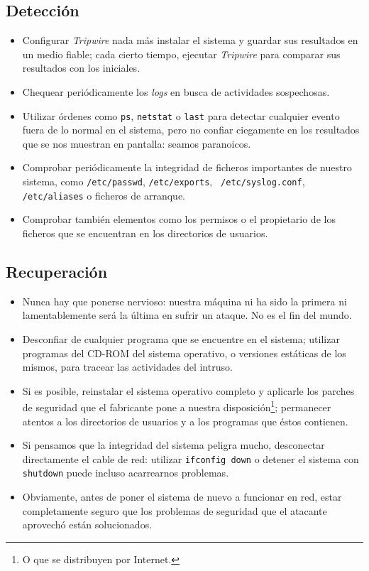 \subsection{Detecci\'on}
\begin{itemize}
\item Configurar {\it Tripwire} nada m\'as instalar el sistema y guardar sus
resultados en un medio fiable; cada cierto tiempo, ejecutar {\it Tripwire} para
comparar sus resultados con los iniciales.
\item Chequear peri\'odicamente los {\it logs} en busca de actividades 
sospechosas.
\item Utilizar \'ordenes como {\tt ps}, {\tt netstat} o {\tt last} para 
detectar cualquier evento fuera de lo normal en el sistema, pero no confiar 
ciegamente en los resultados que se nos muestran en pantalla: seamos paranoicos.
\item Comprobar peri\'odicamente la integridad de ficheros importantes de 
nuestro sistema, como {\tt /etc/passwd}, {\tt /etc/exports}, {\tt 
/etc/syslog.conf}, {\tt /etc/aliases} o ficheros de arranque.
\item Comprobar tambi\'en elementos como los permisos o el propietario de los
ficheros que se encuentran en los directorios de usuarios. 
\end{itemize}
\subsection{Recuperaci\'on}
\begin{itemize}
\item Nunca hay que ponerse nervioso: nuestra m\'aquina ni ha sido la primera
ni lamentablemente ser\'a la \'ultima en sufrir un ataque. No es el fin del
mundo.
\item Desconfiar de cualquier programa que se encuentre en el sistema; utilizar
programas del CD-ROM del sistema operativo, o versiones est\'aticas de los
mismos, para tracear las actividades del intruso.
\item Si es posible, reinstalar el sistema operativo completo y aplicarle los
parches de seguridad que el fabricante pone a nuestra disposici\'on\footnote{O 
que se distribuyen por Internet.}; permanecer 
atentos a los directorios de usuarios y a los programas que \'estos contienen.
\item Si pensamos que la integridad del sistema peligra mucho, desconectar 
directamente el cable de red: utilizar {\tt ifconfig down} o detener el sistema
con {\tt shutdown} puede incluso acarrearnos problemas.
\item Obviamente, antes de poner el sistema de nuevo a funcionar en red, estar
completamente seguro que los problemas de seguridad que el atacante aprovech\'o
est\'an solucionados.
\end{itemize}
